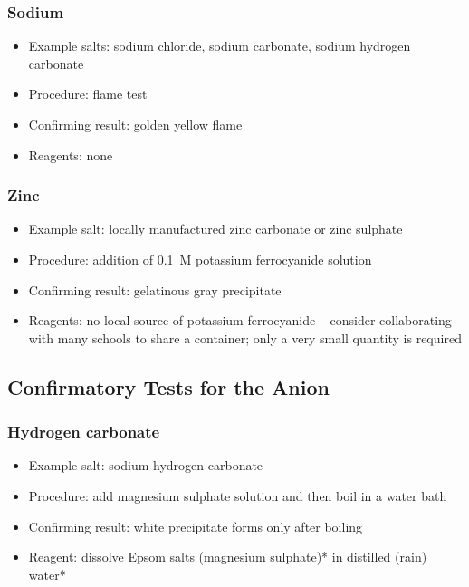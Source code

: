 \subsubsection{Sodium}
\begin{itemize}
\item{Example salts: sodium chloride, sodium carbonate, sodium hydrogen carbonate}
\item{Procedure: flame test}
\item{Confirming result: golden yellow flame}
\item{Reagents: none}
\end{itemize}

\subsubsection{Zinc}
\begin{itemize}
\item{Example salt: locally manufactured zinc carbonate 
or zinc sulphate}
\item{Procedure: addition of 0.1~M potassium ferrocyanide solution}
\item{Confirming result: gelatinous gray precipitate}
\item{Reagents: no local source of potassium ferrocyanide -- consider collaborating with many schools to share a container; only a very small quantity is required}
\end{itemize}

\subsection{Confirmatory Tests for the Anion} 

\subsubsection{Hydrogen carbonate}
\begin{itemize}
\item{Example salt: sodium hydrogen carbonate}
\item{Procedure: add magnesium sulphate solution and then boil in a water bath}
\item{Confirming result: white precipitate forms only after boiling}
\item{Reagent: dissolve Epsom salts (magnesium sulphate)* in distilled (rain) water*}
\end{itemize}

